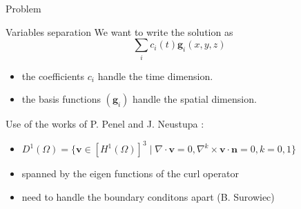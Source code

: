 \documentclass{beamer}
\renewcommand{\div}{{\nabla\cdot}}
\begin{document}
\begin{frame}{Problem}
\begin{block}{Variables separation}
We want to write the solution as
\[ \sum_i c_i(t) \mathbf{g}_i(x,y,z) \]
\begin{itemize}
\item the coefficients $c_i$ handle the time dimension.
\item the basis functions $(\mathbf{g}_i)$ handle the spatial dimension.
\end{itemize}
\end{block}
Use of the works of P. Penel and J. Neustupa \cite{Penel2004} :
\begin{itemize}
\item $D^1(\Omega) = \{\mathbf{v} \in [H^1(\Omega)]^3\; |\; \div\mathbf{v}=0,\nabla^k\times \mathbf{v}\cdot \mathbf{n} = 0, k=0,1 \}$
\item spanned by the eigen functions of the curl operator
\item need to handle the boundary conditons apart (B. Surowiec)
\end{itemize}
\end{frame}
\end{document}
